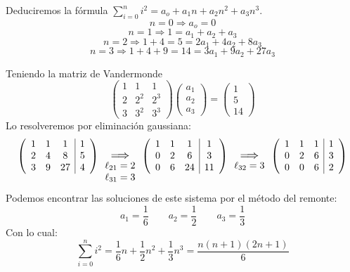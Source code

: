    \begin{ejem}
    Deduciremos la fórmula $\displaystyle \sum_{i=0}^ni^2=a_o+a_1n +a_2n^2+a_3n^3 $.
    $$n=0\Rightarrow a_o=0$$
    $$n=1\Rightarrow 1=a_1+a_2+a_3$$
    $$n=2\Rightarrow 1+4=5=2a_1+4a_2+8a_3$$
    $$n=3\Rightarrow 1+4+9=14=3a_1+9a_2+27a_3$$

    Teniendo la matriz de Vandermonde
    $$\begin{pmatrix}
        1 & 1 & 1 \\
        2 & 2^2 & 2^3 \\
        3 & 3^2 & 3^3  
    \end{pmatrix}\begin{pmatrix}
        a_1 \\
        a_2 \\ 
        a_3
    \end{pmatrix}=\begin{pmatrix}
        1 \\ 5 \\ 14
    \end{pmatrix}$$
   Lo resolveremos por eliminación gaussiana:
    $$\left(\begin{array}{ccc|c}
        1 & 1 & 1&1 \\
        2 & 4 & 8 &5\\
        3 & 9 & 27&4  
    \end{array} \right)
    \underset{\begin{array}{c}
                   \ell_{21}=2 \\
                   \ell_{31}=3
              \end{array}}{\mathlarger{\Longrightarrow}}
    \left(\begin{array}{ccc|c}
        1 & 1 & 1&1 \\
        0 & 2 & 6 &3\\
        0 & 6 & 24&11  
    \end{array}\right) \underset{\begin{array}{c}
                   \ell_{32}=3 
              \end{array}}{\mathlarger{\Longrightarrow}}
        \left(\begin{array}{ccc|c}
        1 & 1 & 1&1 \\
        0 & 2 & 6 &3\\
        0 & 0 &6&2  
    \end{array} \right)$$
   Podemos encontrar las soluciones de este sistema por el método del remonte:
   $$a_1=\dfrac{1}{6} \qquad a_2=\dfrac{1}{2} \qquad a_3=\dfrac{1}{3}$$
   Con lo cual:
   $$\sum_{i=0}^ni^2=\dfrac{1}{6}n+\dfrac{1}{2}n^2+\dfrac{1}{3}n^3=\dfrac{n(n+1)(2n+1)}{6}$$
   \end{ejem} 
